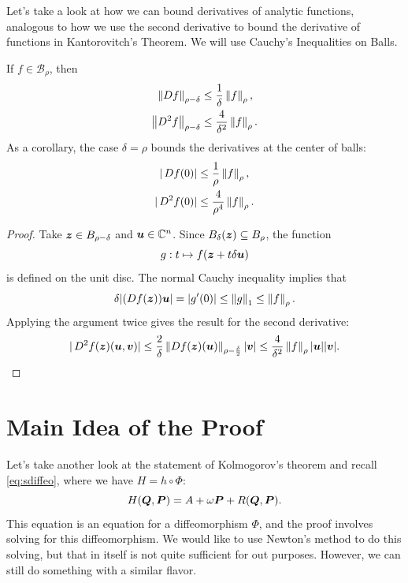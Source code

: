 \documentclass[twoside,letterpaper,10pt]{article}
\numberwithin{equation}{section}
\begin{document}
Let's take a look at how we can bound derivatives of analytic functions,
analogous to how we use the second derivative to bound the derivative of
functions in Kantorovitch's Theorem.
We will use Cauchy's Inequalities on Balls.
\begin{thm}
  If $f \in \mathcal{B}_{\rho}$, then
  \begin{align*}
    \norm{\Dif f}_{\rho - \delta} &\leq \frac{1}{\delta} \norm{f}_{\rho},\\
    \norm{\Dif^2 f}_{\rho - \delta} &\leq \frac{4}{\delta^2} \norm{f}_{\rho}.
  \end{align*}
  As a corollary, the case $\delta = \rho$ bounds the derivatives at the center
  of balls:
  \begin{align*}
    |\Dif f(0)| &\leq \frac{1}{\rho} \norm{f}_{\rho},\\
    |\Dif^2 f(0)| &\leq \frac{4}{\rho^4} \norm{f}_{\rho}.
  \end{align*}
\end{thm}
\begin{proof}
  Take $\bm{z} \in B_{\rho - \delta}$ and $\bm{u} \in \mathbb{C}^n$.
  Since $B_{\delta}(\bm{z}) \subseteq B_{\rho}$, the function
  \begin{equation*}
    g : t \mapsto f(\bm{z} + t \delta \bm{u})
  \end{equation*}
  is defined on the unit disc.
  The normal Cauchy inequality implies that
  \begin{equation*}
    \delta|(\Dif f(\bp{z})) \bp{u}| = |g'(0)| \leq \norm{g}_{1} \leq
    \norm{f}_{\rho}.
  \end{equation*}
  Applying the argument twice gives the result for the second derivative:
  \begin{equation*}
    |\Dif^2 f(\bp{z})(\bp{u}, \bp{v})| \leq \frac{2}{\delta} \norm{\Dif f
      (\bp{z})(\bp{u})}_{\rho - \frac{\delta}{2}}|\bp{v}| \leq
    \frac{4}{\delta^2} \norm{f}_{\rho} |\bp{u}||\bp{v}|.
  \end{equation*}
\end{proof}

\section{Main Idea of the Proof}
\label{sec:main-idea-proof}

Let's take another look at the statement of Kolmogorov's theorem and recall
\cref{eq:sdiffeo}, where we have $H = h \circ \Phi$:
\begin{equation*}
  H(\bm{Q}, \bm{P}) = A + \omega \bm{P} + R(\bm{Q}, \bm{P}).
\end{equation*}
This equation is an equation for a diffeomorphism $\Phi$, and the proof involves
solving for this diffeomorphism.
We would like to use Newton's method to do this solving, but that in itself is
not quite sufficient for out purposes.
However, we can still do something with a similar flavor.
\end{document}
